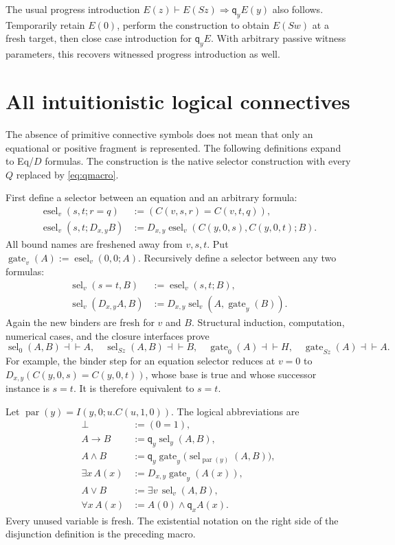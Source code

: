 \documentclass[11pt]{article}
\theoremstyle{definition}\newtheorem{definition}[theorem]{Definition}
\theoremstyle{remark}\newtheorem{remark}[theorem]{Remark}
\newcommand{\sel}{\operatorname{sel}}
\newcommand{\gate}{\operatorname{gate}}
\newcommand{\esel}{\operatorname{esel}}
\newcommand{\parity}{\operatorname{par}}
\newcommand{\qq}{\mathsf q}
\begin{document}
The usual progress introduction $E(z)\vdash E(Sz)\Rightarrow\qq_yE(y)$ also follows. Temporarily retain $E(0)$, perform the construction to obtain $E(Sw)$ at a fresh target, then close case introduction for $\qq_yE$. With arbitrary passive witness parameters, this recovers witnessed progress introduction as well.

\section{All intuitionistic logical connectives}
\label{sec:macros}

The absence of primitive connective symbols does not mean that only an equational or positive fragment is represented. The following definitions expand to Eq/$D$ formulas. The construction is the native selector construction with every $Q$ replaced by \eqref{eq:qmacro}.

First define a selector between an equation and an arbitrary formula:
\begin{align*}
 \esel_v(s,t;r=q)&:=(C(v,s,r)=C(v,t,q)),\\
 \esel_v(s,t;D_{x,y}B)&:=D_{x,y}\esel_v(C(y,0,s),C(y,0,t);B).
\end{align*}
All bound names are freshened away from $v,s,t$. Put $\gate_v(A):=\esel_v(0,0;A)$. Recursively define a selector between any two formulas:
\begin{align*}
 \sel_v(s=t,B)&:=\esel_v(s,t;B),\\
 \sel_v(D_{x,y}A,B)&:=D_{x,y}\sel_v(A,\gate_y(B)).
\end{align*}
Again the new binders are fresh for $v$ and $B$. Structural induction, computation, numerical cases, and the closure interfaces prove
\[
 \sel_0(A,B)\dashv\vdash A,\quad
 \sel_{Sz}(A,B)\dashv\vdash B,\quad
 \gate_0(A)\dashv\vdash H,\quad
 \gate_{Sz}(A)\dashv\vdash A.
\]
For example, the binder step for an equation selector reduces at $v=0$ to
$D_{x,y}(C(y,0,s)=C(y,0,t))$, whose base is true and whose successor instance is $s=t$. It is therefore equivalent to $s=t$.

Let $\parity(y)=I(y,0;u.C(u,1,0))$. The logical abbreviations are
\begin{align*}
 \bot&:=(0=1),\\
 A\to B&:=\qq_y\sel_y(A,B),\\
 A\land B&:=\qq_y\gate_y\bigl(\sel_{\parity(y)}(A,B)\bigr),\\
 \exists x\,A(x)&:=D_{x,y}\gate_y(A(x)),\\
 A\lor B&:=\exists v\,\sel_v(A,B),\\
 \forall x\,A(x)&:=A(0)\land\qq_xA(x).
\end{align*}
Every unused variable is fresh. The existential notation on the right side of the disjunction definition is the preceding macro.
\end{document}
